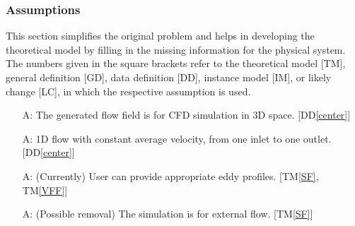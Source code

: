 \documentclass[12pt]{article}
\newcommand{\ddref}[1]{DD\ref{#1}}
\newcommand{\tref}[1]{TM\ref{#1}}
\newcounter{assumpnum} %
\begin{document}


\subsubsection{Assumptions} \label{sec_assumpt}


This section simplifies the original problem and helps in developing the
theoretical model by filling in the missing information for the physical system.
The numbers given in the square brackets refer to the theoretical model [TM],
general definition [GD], data definition [DD], instance model [IM], or likely
change [LC], in which the respective assumption is used.

\begin{itemize}

\item[A\refstepcounter{assumpnum}\theassumpnum \label{A_3D}:] The generated flow field is for CFD simulation in 3D space. [\ddref{center}]
\item[A\refstepcounter{assumpnum}\theassumpnum \label{A_1D}:] 1D flow with constant average velocity, from one inlet to one outlet. [\ddref{center}]
\item[A\refstepcounter{assumpnum}\theassumpnum \label{A_eddy}:] (Currently) User can provide appropriate eddy profiles. [\tref{SF}, \tref{VFF}]
\item[A\refstepcounter{assumpnum}\theassumpnum \label{A_ext}:] (Possible removal) The simulation is for external flow. [\tref{SF}]

\end{itemize}
\end{document}
